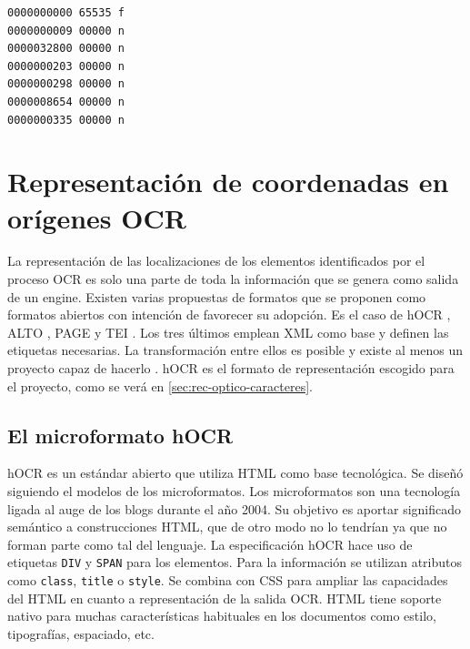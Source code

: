 \begin{lstlisting}[caption={Entradas en la Cross-Reference Table},label=lst:cross-ref-table]
0000000000 65535 f
0000000009 00000 n
0000032800 00000 n
0000000203 00000 n
0000000298 00000 n
0000008654 00000 n
0000000335 00000 n
\end{lstlisting}



\section{Representación de coordenadas en orígenes OCR}

La representación de las localizaciones de los elementos identificados por el proceso OCR es solo una parte de toda la información que se genera como salida de un engine. Existen varias propuestas de formatos que se proponen como formatos abiertos con intención de favorecer su adopción. Es el caso de hOCR \cite{ocrRepres_hocr_breuel_spec}, ALTO \cite{ocrRepres_alto_spec}, PAGE \cite{ocrRepres_page_pletschacher_paper} y TEI \cite{ocrRepres_tei_project}. Los tres últimos emplean XML como base y definen las etiquetas necesarias. La transformación entre ellos es posible y existe al menos un proyecto capaz de hacerlo
\cite{ocrRepres_conversion_ocrFileformat}. hOCR es el formato de representación escogido para el proyecto, como se verá en \ref{sec:rec-optico-caracteres}.

\subsection{El microformato hOCR}

hOCR es un estándar abierto que utiliza HTML como base tecnológica. Se diseñó siguiendo el modelos de los microformatos. Los microformatos son una tecnología ligada al auge de los blogs durante el año 2004. Su objetivo es aportar significado semántico a construcciones HTML, que de otro modo no lo tendrían ya que no forman parte como tal del lenguaje. La especificación hOCR hace uso de etiquetas \verb|DIV| y \verb|SPAN| para los elementos. Para la información se utilizan atributos como \verb|class|, \verb|title| o \verb|style|. Se combina con CSS para ampliar las capacidades del HTML en cuanto a representación de la salida OCR. HTML tiene soporte nativo para muchas características habituales en los documentos como estilo, tipografías, espaciado, etc.

